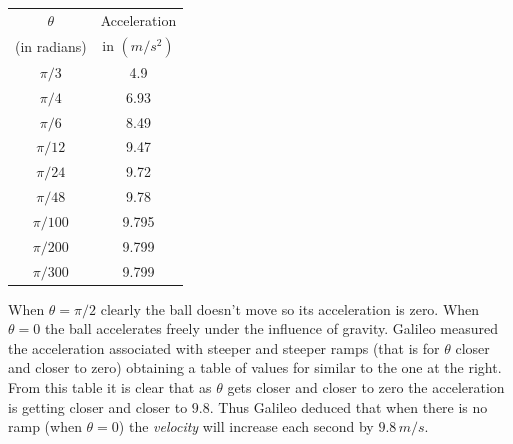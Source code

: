  \begin{table}
 \begin{tabular}{c|c}
 \hline
   $\theta$ &Acceleration\\
      (in radians)      & in $(m/s^2)$\\[2mm]
 \hline{}
   $\pi/3$&4.9\\
   $\pi/4$&6.93\\
   $\pi/6$&8.49\\
   $\pi/12$&9.47\\
   $\pi/24$&9.72\\
   $\pi/48$&9.78\\
   $\pi/100$&9.795\\
   $\pi/200$&9.799\\
   $\pi/300$&9.799\\\hline
 \end{tabular}
 \end{table}
When $\theta=\pi/2$ clearly the ball doesn't move so its acceleration
is zero. When $\theta=0$ the ball accelerates freely under the
influence of gravity. Galileo measured the acceleration associated
with steeper and steeper ramps (that is for $\theta$ closer and closer
to zero) obtaining a table of values for similar to the one at the right. 
From this table it is clear that as $\theta$ gets closer and closer to
zero the acceleration is getting closer and closer to $9.8.$ Thus
Galileo  deduced that when there is no ramp (when
$\theta =0$) the \emph{velocity} will increase each second by $9.8\,
m/s.$ 

